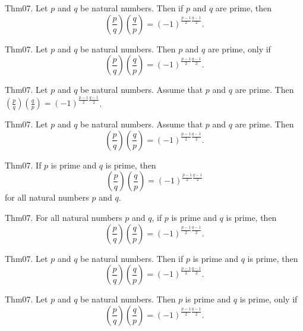 \documentclass{article}
\begin{document}
Thm07. Let $p$ and $q$ be natural numbers. Then if $p$ and $q$ are prime, then $$\left(\frac{ p }{ q }\right) \left(\frac{ q }{ p }\right) = (- 1)^ {\frac{ p - 1}{2}\frac{ q - 1}{2}}.$$

Thm07. Let $p$ and $q$ be natural numbers. Then $p$ and $q$ are prime, only if $$\left(\frac{ p }{ q }\right) \left(\frac{ q }{ p }\right) = (- 1)^ {\frac{ p - 1}{2}\frac{ q - 1}{2}}.$$

Thm07. Let $p$ and $q$ be natural numbers. Assume that $p$ and $q$ are prime. Then $\left(\frac{ p }{ q }\right) \left(\frac{ q }{ p }\right) = (- 1)^ {\frac{ p - 1}{2}\frac{ q - 1}{2}}$.

Thm07. Let $p$ and $q$ be natural numbers. Assume that $p$ and $q$ are prime. Then $$\left(\frac{ p }{ q }\right) \left(\frac{ q }{ p }\right) = (- 1)^ {\frac{ p - 1}{2}\frac{ q - 1}{2}}.$$

Thm07. If $p$ is prime and $q$ is prime, then $$\left(\frac{ p }{ q }\right) \left(\frac{ q }{ p }\right) = (- 1)^ {\frac{ p - 1}{2}\frac{ q - 1}{2}}$$ for all natural numbers $p$ and $q$.

Thm07. For all natural numbers $p$ and $q$, if $p$ is prime and $q$ is prime, then $$\left(\frac{ p }{ q }\right) \left(\frac{ q }{ p }\right) = (- 1)^ {\frac{ p - 1}{2}\frac{ q - 1}{2}}.$$

Thm07. Let $p$ and $q$ be natural numbers. Then if $p$ is prime and $q$ is prime, then $$\left(\frac{ p }{ q }\right) \left(\frac{ q }{ p }\right) = (- 1)^ {\frac{ p - 1}{2}\frac{ q - 1}{2}}.$$

Thm07. Let $p$ and $q$ be natural numbers. Then $p$ is prime and $q$ is prime, only if $$\left(\frac{ p }{ q }\right) \left(\frac{ q }{ p }\right) = (- 1)^ {\frac{ p - 1}{2}\frac{ q - 1}{2}}.$$
\end{document}
